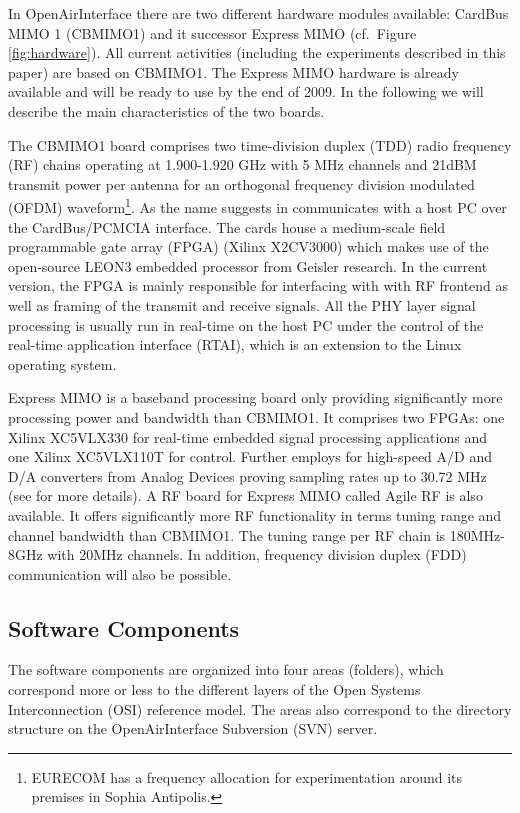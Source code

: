 \documentclass[a4paper,twocolumn,journal]{IEEEtran}
\begin{document}
In OpenAirInterface there are two different hardware modules available: CardBus MIMO 1 (CBMIMO1) and it successor Express MIMO (cf.\ Figure \ref{fig:hardware}). All current activities (including the experiments described in this paper) are based on CBMIMO1. The Express MIMO hardware is already available and will be ready to use by the end of 2009. In the following we will describe the main characteristics of the two boards.

The CBMIMO1 board comprises two time-division duplex (TDD) radio frequency (RF) chains operating at 1.900-1.920 GHz with 5 MHz channels and 21dBM transmit power per antenna for an orthogonal frequency division modulated (OFDM) waveform\footnote{EURECOM has a frequency allocation for experimentation around its premises in Sophia Antipolis.}. As the name suggests in communicates with a host PC over the CardBus/PCMCIA interface. The cards house a medium-scale field programmable gate array (FPGA) (Xilinx X2CV3000) which makes use of the open-source LEON3 embedded processor from Geisler research. In the current version, the FPGA is mainly responsible for interfacing with with RF frontend as well as framing of the transmit and receive signals. All the PHY layer signal processing is usually run in real-time on the host PC under the control of the real-time application interface (RTAI), which is an extension to the  Linux operating system.

Express MIMO is a baseband processing board only providing significantly more processing power and bandwidth than CBMIMO1. It comprises two FPGAs: one Xilinx XC5VLX330 for real-time embedded signal processing applications and one Xilinx XC5VLX110T for control. Further employs for high-speed A/D and D/A converters from Analog Devices proving sampling rates up to 30.72 MHz (see \cite{Muhammad2008} for more details). A RF board for Express MIMO called Agile RF is also available. It offers significantly more RF functionality in terms tuning range and channel bandwidth than CBMIMO1. The tuning range per RF chain is 180MHz-8GHz with 20MHz channels. In addition, frequency division duplex (FDD) communication will also be possible. 

\subsection{Software Components}
\label{sec:soft}

The software components are organized into four areas (folders), which correspond more or less to the different layers of the Open Systems Interconnection (OSI) reference model. The areas also correspond to the directory structure on the OpenAirInterface Subversion (SVN) server.
\end{document}
